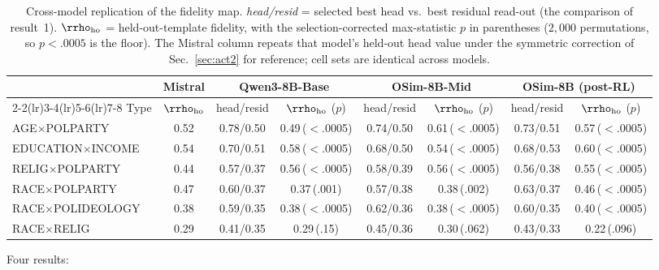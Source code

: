 \begin{table}[t]
\centering\footnotesize
\setlength{\tabcolsep}{3pt}
\caption{Cross-model replication of the fidelity map. \emph{head/resid} =
selected best head vs.\ best residual read-out (the comparison of
result~1).
$\rrho_{\text{ho}}$ = held-out-template fidelity, with the
selection-corrected max-statistic $p$ in parentheses
($2{,}000$ permutations, so $p<.0005$ is the floor). The Mistral column
repeats that model's held-out head value under the symmetric correction
of Sec.~\ref{sec:act2} for reference; cell sets are identical across
models.}
\label{tab:crossmodel}
\begin{tabular}{lccccccc}
\toprule
& Mistral & \multicolumn{2}{c}{Qwen3-8B-Base}
& \multicolumn{2}{c}{OSim-8B-Mid} & \multicolumn{2}{c}{OSim-8B (post-RL)}\\
\cmidrule(lr){2-2}\cmidrule(lr){3-4}\cmidrule(lr){5-6}\cmidrule(lr){7-8}
Type & $\rrho_{\text{ho}}$ & head/resid & $\rrho_{\text{ho}}$ ($p$)
& head/resid & $\rrho_{\text{ho}}$ ($p$)
& head/resid & $\rrho_{\text{ho}}$ ($p$)\\
\midrule
AGE$\times$POLPARTY & 0.52 & 0.78/0.50 & 0.49\,($<$.0005) & 0.74/0.50 & 0.61\,($<$.0005) & 0.73/0.51 & 0.57\,($<$.0005) \\
EDUCATION$\times$INCOME & 0.54 & 0.70/0.51 & 0.58\,($<$.0005) & 0.68/0.50 & 0.54\,($<$.0005) & 0.68/0.53 & 0.60\,($<$.0005) \\
RELIG$\times$POLPARTY & 0.44 & 0.57/0.37 & 0.56\,($<$.0005) & 0.58/0.39 & 0.56\,($<$.0005) & 0.56/0.38 & 0.55\,($<$.0005) \\
RACE$\times$POLPARTY & 0.47 & 0.60/0.37 & 0.37\,(.001) & 0.57/0.38 & 0.38\,(.002) & 0.63/0.37 & 0.46\,($<$.0005) \\
RACE$\times$POLIDEOLOGY & 0.38 & 0.59/0.35 & 0.38\,($<$.0005) & 0.62/0.36 & 0.38\,($<$.0005) & 0.60/0.35 & 0.40\,($<$.0005) \\
RACE$\times$RELIG & 0.29 & 0.41/0.35 & 0.29\,(.15) & 0.45/0.36 & 0.30\,(.062) & 0.43/0.33 & 0.22\,(.096) \\
\bottomrule
\end{tabular}
\end{table}

Four results:

